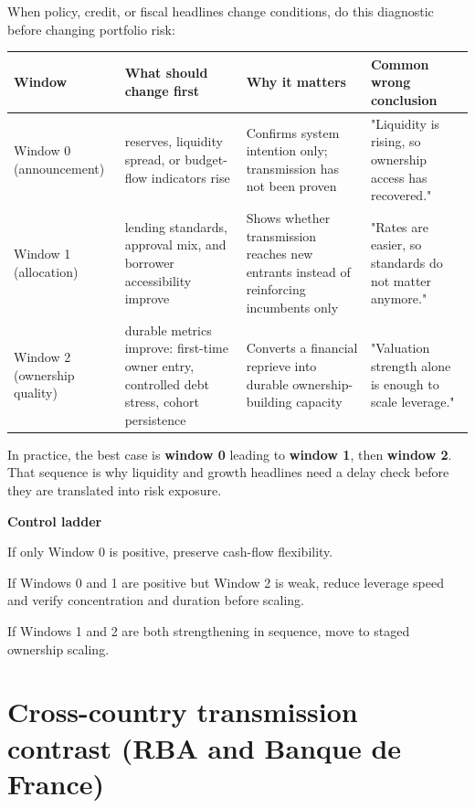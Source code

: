 \documentclass[11pt,openany]{book}
\begin{document}
When policy, credit, or fiscal headlines change conditions, do this diagnostic before changing portfolio risk:

\begin{center}
\small
\begin{tabularx}{\textwidth}{>{\raggedright\arraybackslash}p{}>{\raggedright\arraybackslash}p{}>{\raggedright\arraybackslash}p{}>{\raggedright\arraybackslash}p{}}
\toprule
\textbf{Window} & \textbf{What should change first} & \textbf{Why it matters} & \textbf{Common wrong conclusion} \\
\midrule
Window 0 (announcement) & reserves, liquidity spread, or budget-flow indicators rise & Confirms system intention only; transmission has not been proven & "Liquidity is rising, so ownership access has recovered." \\
Window 1 (allocation) & lending standards, approval mix, and borrower accessibility improve & Shows whether transmission reaches new entrants instead of reinforcing incumbents only & "Rates are easier, so standards do not matter anymore." \\
Window 2 (ownership quality) & durable metrics improve: first-time owner entry, controlled debt stress, cohort persistence & Converts a financial reprieve into durable ownership-building capacity & "Valuation strength alone is enough to scale leverage." \\
\bottomrule
\end{tabularx}
\normalsize
\end{center}

In practice, the best case is \textbf{window 0} leading to \textbf{window 1}, then \textbf{window 2}. That sequence is why liquidity and growth headlines need a delay check before they are translated into risk exposure.

\begin{signalbox}
\textbf{Control ladder}\par
If only Window 0 is positive, preserve cash-flow flexibility.\par
If Windows 0 and 1 are positive but Window 2 is weak, reduce leverage speed and verify concentration and duration before scaling.\par
If Windows 1 and 2 are both strengthening in sequence, move to staged ownership scaling.
\end{signalbox}

\section{Cross-country transmission contrast (RBA and Banque de France)}
\end{document}
